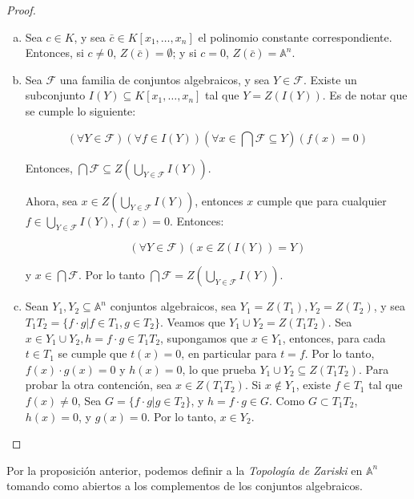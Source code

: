 \begin{proof}
\begin{enumerate}[(a)]
\item Sea $c \in K$, y sea $\bar{c} \in K[x_1, \dots, x_n]$ el polinomio constante correspondiente. Entonces, si $c \neq 0$, $Z({\bar{c}}) = \emptyset$; y si $c = 0$, $Z({\bar{c}}) = \mathbb{A}^n$.
\item Sea $\mathscr{F}$ una familia de conjuntos algebraicos, y sea $Y \in \mathscr{F}$. Existe un subconjunto $I(Y) \subseteq K[x_1, \dots, x_n]$ tal que $Y = Z(I(Y))$. Es de notar que se cumple lo siguiente:

$$\left(\forall Y \in \mathscr{F}\right)\left(\forall f \in I(Y)\right)\left(\forall x \in \bigcap \mathscr{F} \subseteq Y\right)\left(f(x) = 0\right)$$

Entonces, $\bigcap \mathscr{F} \subseteq Z\left(\bigcup_{Y \in \mathscr{F}} I(Y)\right)$. 

Ahora, sea $x \in Z\left(\bigcup_{Y \in \mathscr{F}} I(Y)\right)$, entonces $x$ cumple que para cualquier $f \in \bigcup_{Y \in \mathscr{F}} I(Y)$, $f(x) = 0$. Entonces:

$$(\forall Y \in \mathscr{F})(x \in Z(I(Y)) = Y)$$

y $x \in \bigcap\mathscr{F}$. Por lo tanto $\bigcap \mathscr{F} = Z\left(\bigcup_{Y \in \mathscr{F}} I(Y)\right)$.

\item Sean $Y_1, Y_2 \subseteq \mathbb{A}^n$ conjuntos algebraicos, sea $Y_1 = Z(T_1), Y_2 = Z(T_2)$, y sea $T_1T_2 = \{f\cdot g|f \in T_1, g \in T_2\}$. Veamos que $Y_1\cup Y_2 = Z(T_1T_2)$. Sea $x \in Y_1\cup Y_2, h = f\cdot g \in T_1T_2$, supongamos que $x \in Y_1$, entonces, para cada $t \in  T_1$ se cumple que $t(x) = 0$, en particular para $t = f$. Por lo tanto, $f(x)\cdot g(x) = 0$ y $h(x) = 0$, lo que prueba $Y_1 \cup Y_2 \subseteq Z(T_1T_2)$. Para probar la otra contención, sea $x \in Z(T_1T_2)$. Si $x \not \in Y_1$, existe $f \in T_1$ tal que $f(x) \neq 0$, Sea $G = \{ f\cdot g | g \in T_2 \}$, y $h = f\cdot g \in G$. Como $G \subset T_1T_2$, $h(x) = 0$, y $g(x) = 0$. Por lo tanto, $x \in Y_2$.

\end{enumerate}
\end{proof}

\begin{definition}
Por la proposición anterior, podemos definir a la \emph{Topología de Zariski} en $\mathbb{A}^n$ tomando como abiertos a los complementos de los conjuntos algebraicos.
\end{definition}

